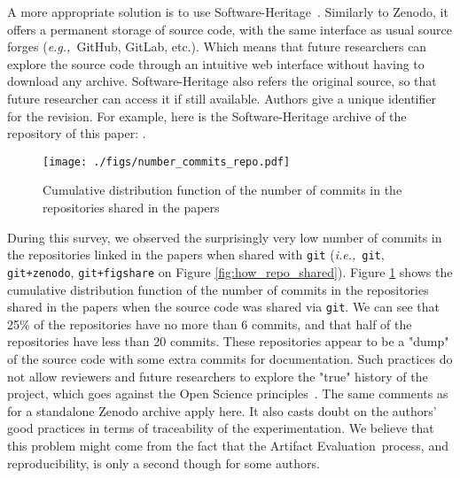 \documentclass[sigconf,natbib=false]{acmart}
\newcommand{\ie}{\emph{i.e.,}}
\newcommand{\eg}{\emph{e.g.,}}
\newcommand{\aeval}{Artifact Evaluation}
\newcommand{\todo}[1]{{\color{red}{TODO: #1}}}
\begin{document}
A more appropriate solution is to use Software-Heritage\ \cite{swheritage, di2017software}.
Similarly to Zenodo, it offers a permanent storage of source code, with the same interface as usual source forges (\eg\ GitHub, GitLab, etc.).
Which means that future researchers can explore the source code through an intuitive web interface without having to download any archive.
Software-Heritage also refers the original source, so that future researcher can access it if still available.
Authors give a unique identifier for the revision. 
For example, here is the Software-Heritage archive of the repository of this paper: \cite{artefact-lifetime}.


\begin{figure}
  \centering
  \texttt{[image: ./figs/number\_commits\_repo.pdf]}
  \caption{Cumulative distribution function of the number of commits in the repositories shared in the papers}\label{fig:number_commits_repo}
\end{figure}

During this survey, we observed the surprisingly very low number of commits in the repositories linked in the papers when shared with \texttt{git} (\ie\ \texttt{git}, \texttt{git+zenodo}, \texttt{git+figshare} on Figure \ref{fig:how_repo_shared}).
Figure \ref{fig:number_commits_repo} shows the cumulative distribution function of the number of commits in the repositories shared in the papers when the source code was shared via \texttt{git}.
We can see that 25\% of the repositories have no more than 6 commits, and that half of the repositories have less than 20 commits.
These repositories appear to be a "dump" of the source code with some extra commits for documentation.
Such practices do not allow reviewers and future researchers to explore the "true" history of the project, which goes against the Open Science principles\ \cite{openscience_unesco}.
The same comments as for a standalone Zenodo archive apply here.
It also casts doubt on the authors' good practices in terms of traceability of the experimentation.
We believe that this problem might come from the fact that the \aeval\ process, and reproducibility, is only a second though for some authors.
\end{document}
